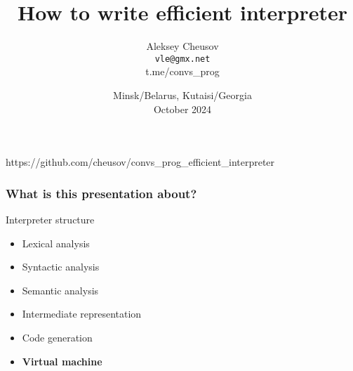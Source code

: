 \documentclass[hyperref={colorlinks=true},xcolor=table]{beamer}
\title{How to write efficient interpreter}
\author{Aleksey Cheusov 
  \\  \texttt{vle@gmx.net}\\
  t.me/convs\_prog\\
}
\date{Minsk/Belarus, Kutaisi/Georgia\\
  October 2024\\
}
\begin{document}

\newenvironment{Code}[1]%
              {\Verbatim[label=\bf{#1},frame=single,%
                  fontsize=\small,%
                  commandchars=\\\{\}]}%
              {\endVerbatim}


\newenvironment{CodeNoLabel}%
               {\Verbatim[frame=single,%
                   fontsize=\small,%
                   commandchars=\\\{\}]}%
               {\endVerbatim}
\newenvironment{CodeNoLabelTiny}%
               {\Verbatim[frame=single,%
                   fontsize=\tiny,%
                   commandchars=\\\{\}]}%
               {\endVerbatim}
\newenvironment{CodeNoLabelSmallest}%
               {\Verbatim[frame=single,%
                   fontsize=\footnotesize,%
                   commandchars=\\\{\}]}%
               {\endVerbatim}
\newenvironment{CodeLarge}%
               {\Verbatim[frame=single,%
                   fontsize=\large,%
                   commandchars=\\\{\}]}%
               {\endVerbatim}

\newcommand{\prompt}[1]{{\bf{#1}}}
\newcommand{\h}[1]{{\bf{#1}}}
\newcommand{\URL}[1]{\textbf{#1}}
\newcommand{\AutohellFile}[1]{\textcolor{red}{#1}}
\newcommand{\MKCfile}[1]{\textcolor{green}{#1}}
\newcommand{\ModuleName}[1]{\textbf{#1}\textnormal{}}
\newcommand{\ProgName}[1]{\textbf{#1}\textnormal{}}
\newcommand{\ProjectName}[1]{\textbf{#1}\textnormal{}}
\newcommand{\PackageName}[1]{\textbf{#1}\textnormal{}}
\newcommand{\MKC}[1]{\large\textsf{#1}\textnormal{}\normalsize}

\begin{frame}
  \titlepage
  https://github.com/cheusov/convs\_prog\_efficient\_interpreter
\end{frame}

\begin{frame}
  \frametitle{What is this presentation about?}
  Interpreter structure
  \begin{itemize}
  \item Lexical analysis
  \item Syntactic analysis
  \item Semantic analysis
  \item Intermediate representation
  \item Code generation
  \item \textbf{Virtual machine}
  \end{itemize}
\end{frame}
\end{document}
